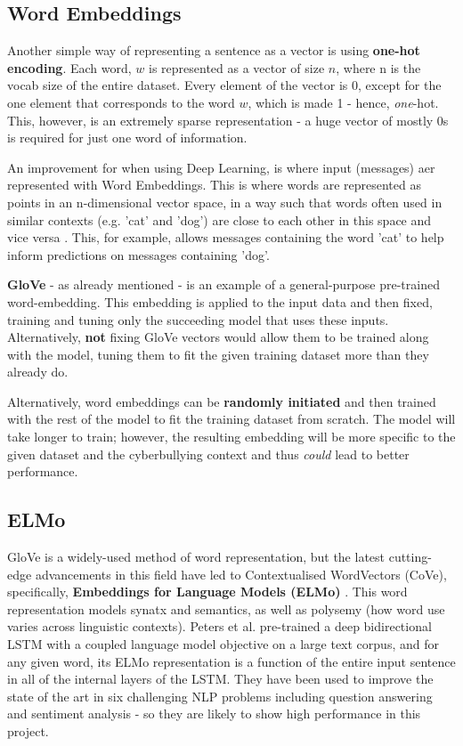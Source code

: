 \documentclass[12pt,a4paper]{article}
\begin{document}
\subsection{Word Embeddings}
Another simple way of representing a sentence as a vector is using \textbf{one-hot encoding}. Each word, $w$ is represented as a vector of size $n$, where n is the vocab size of the entire dataset. Every element of the vector is 0, except for the one element that corresponds to the word $w$, which is made 1 - hence, \textit{one}-hot. This, however, is an extremely sparse representation - a huge vector of mostly 0s is required for just one word of information.

An improvement for when using Deep Learning, is where input (messages) aer represented with Word Embeddings. This is where words are represented as points in an n-dimensional vector space, in a way such that words often used in similar contexts (e.g. 'cat' and 'dog') are close to each other in this space and vice versa \cite[p.464]{DL}. This, for example, allows messages containing the word 'cat' to help inform predictions on messages containing 'dog'.

\textbf{GloVe} \cite{glove} - as already mentioned - is an example of a general-purpose pre-trained word-embedding. This embedding is applied to the input data and then fixed, training and tuning only the succeeding model that uses these inputs. Alternatively, \textbf{not} fixing GloVe vectors would allow them to be trained along with the model, tuning them to fit the given training dataset more than they already do.

Alternatively, word embeddings can be \textbf{randomly initiated} and then trained with the rest of the model to fit the training dataset from scratch. The model will take longer to train; however, the resulting embedding will be more specific to the given dataset and the cyberbullying context and thus \textit{could} lead to better performance. 

\subsection{ELMo}
GloVe is a widely-used method of word representation, but the latest cutting-edge advancements in this field have led to Contextualised WordVectors (CoVe), specifically, \textbf{Embeddings for Language Models (ELMo)} \cite{Peters}. This word representation models synatx and semantics, as well as polysemy (how word use varies across linguistic contexts). Peters et al. pre-trained a deep bidirectional LSTM with a coupled language model objective on a large text corpus, and for any given word, its ELMo representation is a function of the entire input sentence in all of the internal layers of the LSTM. They have been used to improve the state of the art in six challenging NLP problems including question answering and sentiment analysis - so they are likely to show high performance in this project.
\end{document}
